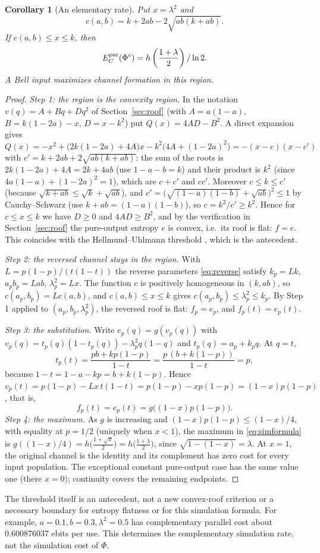 \documentclass[11pt]{article}
\newtheorem{corollary}[theorem]{Corollary}
\begin{document}
\begin{corollary}[An elementary rate]\label{cor:closedcost}
Put $x=\lambda^2$ and
\[
 c(a,b)=k+2ab-2\sqrt{ab(k+ab)}.
\]
If $c(a,b)\le x\le k$, then
\[
 E_C^{\rm par}(\Phi^c)=h\left(\frac{1+\lambda}{2}\right)/\ln2.
\]
A Bell input maximizes channel formation in this region.
\end{corollary}
\begin{proof}
\emph{Step 1: the region is the convexity region.} In the notation $v(q)=A+Bq+Dq^2$ of Section~\ref{sec:roof} (with $A=a(1-a)$, $B=k(1-2a)-x$, $D=x-k^2$) put $Q(x)=4AD-B^2$. A direct expansion gives
$Q(x)=-x^2+\bigl(2k(1-2a)+4A\bigr)x-k^2\bigl(4A+(1-2a)^2\bigr)=-(x-c)(x-c')$ with
$c'=k+2ab+2\sqrt{ab(k+ab)}$: the sum of the roots is $2k(1-2a)+4A=2k+4ab$ (use $1-a-b=k$) and their product is $k^2$ (since $4a(1-a)+(1-2a)^2=1$), which are $c+c'$ and $cc'$. Moreover $c\le k\le c'$ (because $\sqrt{k+ab}\le\sqrt k+\sqrt{ab}$), and $c'=\bigl(\sqrt{(1-a)(1-b)}+\sqrt{ab}\bigr)^2\le1$ by Cauchy--Schwarz (use $k+ab=(1-a)(1-b)$), so $c=k^2/c'\ge k^2$. Hence for $c\le x\le k$ we have $D\ge0$ and $4AD\ge B^2$, and by the verification in Section~\ref{sec:roof} the pure-output entropy $e$ is convex, i.e.\ its roof is flat: $f=e$. This coincides with the Hellmund--Uhlmann threshold \cite[Equation (29) and Section V.B]{hu}, which is the antecedent.

\emph{Step 2: the reversed channel stays in the region.} With $L=p(1-p)/(t(1-t))$ the reverse parameters \eqref{eq:reverse} satisfy $k_p=Lk$, $a_pb_p=Lab$, $\lambda_p^2=Lx$. The function $c$ is positively homogeneous in $(k,ab)$, so $c(a_p,b_p)=Lc(a,b)$, and $c(a,b)\le x\le k$ gives $c(a_p,b_p)\le\lambda_p^2\le k_p$. By Step 1 applied to $(a_p,b_p,\lambda_p^2)$, the reversed roof is flat: $f_p=e_p$, and $f_p(t)=e_p(t)$.

\emph{Step 3: the substitution.} Write $e_p(q)=g(v_p(q))$ with $v_p(q)=t_p(q)(1-t_p(q))-\lambda_p^2q(1-q)$ and $t_p(q)=a_p+k_pq$. At $q=t$,
\[
 t_p(t)=\frac{pb+kp(1-p)}{1-t}=\frac{p\,(b+k(1-p))}{1-t}=p,
\]
because $1-t=1-a-kp=b+k(1-p)$. Hence $v_p(t)=p(1-p)-Lx\,t(1-t)=p(1-p)-xp(1-p)=(1-x)p(1-p)$, that is,
\[
 f_p(t)=e_p(t)=g\bigl((1-x)p(1-p)\bigr).
\]
\emph{Step 4: the maximum.} As $g$ is increasing and $(1-x)p(1-p)\le(1-x)/4$, with equality at $p=1/2$ (uniquely when $x<1$), the maximum in \eqref{eq:simformula} is $g((1-x)/4)=h\bigl(\tfrac{1+\sqrt{x}}2\bigr)=h\bigl(\tfrac{1+\lambda}2\bigr)$, since $\sqrt{1-(1-x)}=\lambda$. At $x=1$, the original channel is the identity and its complement has zero cost for every input population. The exceptional constant pure-output case has the same value one (there $x=0$); continuity covers the remaining
endpoints.
\end{proof}
The threshold itself is an antecedent, not a new convex-roof criterion or
a necessary boundary for entropy flatness or for this simulation formula.
For example, $a=0.1,b=0.3,\lambda^2=0.5$ has complementary parallel cost
about $0.600876037$ ebits per use. This determines the complementary
simulation rate, not the simulation cost of $\Phi$.
\end{document}
